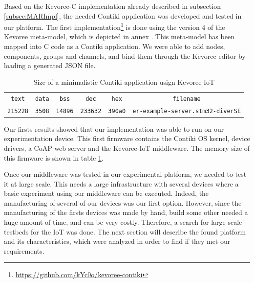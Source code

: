 
Based on the Kevoree-C implementation already described in subsection \ref{subsec:MARImpl}, the needed Contiki application was developed and tested in our platform.
The first implementation\footnote{\url{https://github.com/kYc0o/kevoree-contiki}} is done using the version 4 of the Kevoree meta-model, which is depicted in annex .
This meta-model has been mapped into C code as a Contiki application.
We were able to add nodes, components, groups and channels, and bind them through the Kevoree editor by loading a generated JSON file.

\begin{table}[htb]
	\centering
	\caption{Size of a minimalistic Contiki application usign Kevoree-IoT}
	\label{tab:kevoreeContiki}
	\begin{tabular}{cccccc}
		\texttt{text}   & \texttt{data} & \texttt{bss} & \texttt{dec}    & \texttt{hex}   & \texttt{filename} \\
		\texttt{215228} & \texttt{3508} & \texttt{14896} & \texttt{233632} & \texttt{390a0} & \texttt{er-example-server.stm32-diverSE}        
	\end{tabular}
\end{table}

Our firsts results showed that our implementation was able to run on our experimentation device.
This first firmware contains the Contiki OS kernel, device drivers, a CoAP web server and the Kevoree-IoT middleware.
The memory size of this firmware is shown in table \ref{tab:kevoreeContiki}.

Once our middleware was tested in our experimental platform, we needed to test it at large scale.
This needs a large infrastructure with several devices where a basic experiment using our middleware can be executed.
Indeed, the manufacturing of several of our devices was our first option.
However, since the manufacturing of the firsts devices was made by hand, build some other needed a huge amount of time, and can be very costly.
Therefore, a search for large-scale testbeds for the IoT was done.
The next section will describe the found platform and its characteristics, which were analyzed in order to find if they met our requirements.

